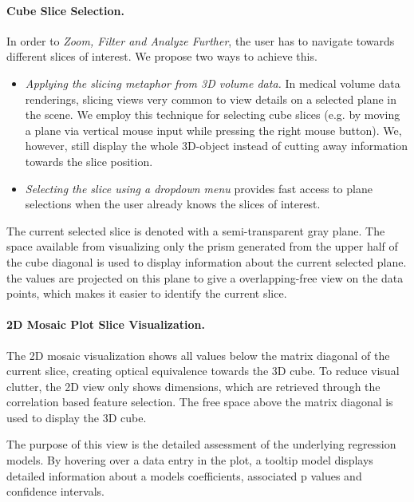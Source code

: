 \documentclass[journal]{style/vgtc} 			          %
\newcommand{\com}[1]{\textcolor{orange}{\uline{#1}}}
\begin{document}
\paragraph{Cube Slice Selection.}
In order to \emph{Zoom, Filter and Analyze Further}, the user has to navigate towards different slices of interest.
We propose two ways to achieve this.
\begin{itemize}
	\item \emph{Applying the slicing metaphor from 3D volume data.}
	In medical volume data renderings, slicing views very common to view details on a selected plane in the scene.
	We employ this technique for selecting cube slices (e.g. by moving a plane via vertical mouse input while pressing the right mouse button).
	We, however, still display the whole 3D-object instead of cutting away information towards the slice position.
	\item \emph{Selecting the slice using a dropdown menu} provides fast access to plane selections when the user already knows the slices of interest.
\end{itemize}
The current selected slice is denoted with a semi-transparent gray plane.
The space available from visualizing only the prism generated from the upper half of the cube diagonal is used to display information about the current selected plane.
the values are projected on this plane to give a overlapping-free view on the data points, which makes it easier to identify the current slice.
\paragraph{2D Mosaic Plot Slice Visualization.}
The 2D mosaic visualization shows all values below the matrix diagonal of the current slice, creating optical equivalence towards the 3D cube.
To reduce visual clutter, the 2D view only shows dimensions, which are retrieved through the correlation based feature selection.
The free space above the matrix diagonal is used to display the 3D cube.

The purpose of this view is the detailed assessment of the underlying regression models.
By hovering over a data entry in the plot, a tooltip model displays detailed information about a models coefficients, associated p values and confidence intervals.
\end{document}
